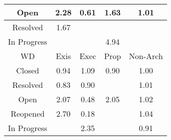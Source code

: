 \begin{tabular}{|c||c|c|c|c|}
\hline
Open & \cellcolor[rgb]{0.8473025974702775,0.8103012303806577,0.42} 2.28 & \cellcolor[rgb]{0.8376878445242393,0.49772246408139925,0.35250865488929} 0.61 & \cellcolor[rgb]{0.8790596519454086,0.8253440456583513,0.42} 1.63 & \cellcolor[rgb]{0.9096042449691818,0.8398125370906651,0.42} 1.01 \\ 
\hline
Resolved & \cellcolor[rgb]{0.8770706424075614,0.8244018832456869,0.42} 1.67 &  &  &  \\ 
\hline
In Progress &  &  & \cellcolor[rgb]{0.7162991688126694,0.7482469747007381,0.42} 4.94 &  \\ 
\hline
\hline
WD & Exis & Exec & Prop & Non-Arch \\ 
\hline
Closed & \cellcolor[rgb]{0.8985132529917549,0.7856293974943063,0.4092790361256379} 0.94 & \cellcolor[rgb]{0.9054437392722915,0.8378417712342433,0.42} 1.09 & \cellcolor[rgb]{0.8910686418806566,0.7503915715684413,0.40233073242194617} 0.90 & \cellcolor[rgb]{0.9091832333104343,0.8361339710027217,0.41923768442307185} 1.00 \\ 
\hline
Resolved & \cellcolor[rgb]{0.8786925226337919,0.6918112737999484,0.39077968779153915} 0.83 & \cellcolor[rgb]{0.892221186241648,0.7558469482104672,0.40340644049220475} 0.90 &  & \cellcolor[rgb]{0.9096914858023638,0.8398538616958565,0.42} 1.01 \\ 
\hline
Open & \cellcolor[rgb]{0.8576606656888822,0.8152076837473652,0.42} 2.07 & \cellcolor[rgb]{0.8149327440505235,0.3900149885058112,0.3312705611138219} 0.48 & \cellcolor[rgb]{0.8582081496155016,0.8154670182389218,0.42} 2.05 & \cellcolor[rgb]{0.9090211008020664,0.8395363109062418,0.42} 1.02 \\ 
\hline
Reopened & \cellcolor[rgb]{0.8263886437826522,0.800394620739151,0.42} 2.70 & \cellcolor[rgb]{0.76,0.13,0.28} 0.18 &  & \cellcolor[rgb]{0.9082010461266103,0.8391478639547101,0.42} 1.04 \\ 
\hline
In Progress &  & \cellcolor[rgb]{0.8435267000413003,0.8085126473879843,0.42000000000000004} 2.35 &  & \cellcolor[rgb]{0.8939889891382965,0.7642145485879366,0.40505638986241} 0.91 \\ 
\hline
\end{tabular}